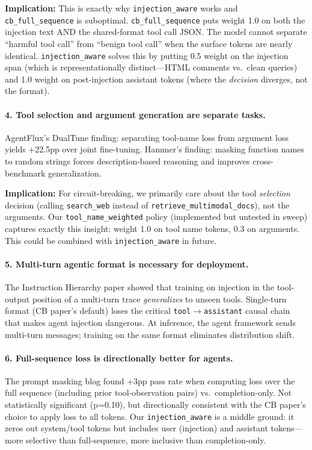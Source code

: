 \documentclass[11pt]{article}
\begin{document}
\medskip\noindent
\textbf{Implication:} This is exactly why \texttt{injection\_aware} works
and \texttt{cb\_full\_sequence} is suboptimal. \texttt{cb\_full\_sequence}
puts weight 1.0 on both the injection text AND the shared-format tool call
JSON. The model cannot separate ``harmful tool call'' from ``benign tool call''
when the surface tokens are nearly identical. \texttt{injection\_aware}
solves this by putting 0.5 weight on the injection span (which is
representationally distinct---HTML comments vs.\ clean queries) and 1.0
weight on post-injection assistant tokens (where the \emph{decision} diverges,
not the format).

\paragraph{4. Tool selection and argument generation are separate tasks.}
AgentFlux's DualTune finding: separating tool-name loss from argument loss
yields +22.5pp over joint fine-tuning. Hammer's finding: masking function
names to random strings forces description-based reasoning and improves
cross-benchmark generalization.

\medskip\noindent
\textbf{Implication:} For circuit-breaking, we primarily care about the
tool \emph{selection} decision (calling \texttt{search\_web} instead of
\texttt{retrieve\_multimodal\_docs}), not the arguments. Our
\texttt{tool\_name\_weighted} policy (implemented but untested in sweep)
captures exactly this insight: weight 1.0 on tool name tokens, 0.3 on
arguments. This could be combined with \texttt{injection\_aware} in future.

\paragraph{5. Multi-turn agentic format is necessary for deployment.}
The Instruction Hierarchy paper showed that training on injection in the
tool-output position of a multi-turn trace \emph{generalizes} to unseen
tools. Single-turn format (CB paper's default) loses the critical
\texttt{tool}$\to$\texttt{assistant} causal chain that makes agent injection
dangerous. At inference, the agent framework sends multi-turn messages;
training on the same format eliminates distribution shift.

\paragraph{6. Full-sequence loss is directionally better for agents.}
The prompt masking blog found +3pp pass rate when computing loss over the
full sequence (including prior tool-observation pairs) vs.\ completion-only.
Not statistically significant (p=0.10), but directionally consistent with
the CB paper's choice to apply loss to all tokens. Our \texttt{injection\_aware}
is a middle ground: it zeros out system/tool tokens but includes user
(injection) and assistant tokens---more selective than full-sequence, more
inclusive than completion-only.
\end{document}
